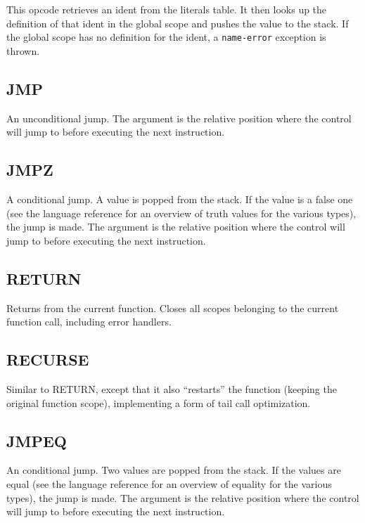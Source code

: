This opcode retrieves an ident from the literals table. It then looks up
the definition of that ident in the global scope and pushes the value to
the stack. If the global scope has no definition for the ident, a
\verb!name-error! exception is thrown.

\subsection{JMP}
\label{sec:jmp}

An unconditional jump. The argument is the relative position where the
control will jump to before executing the next instruction.

\subsection{JMPZ}
\label{sec:jmpz}

A conditional jump. A value is popped from the stack. If the value is
a false one (see the language reference for an overview of truth values
for the various types), the jump is made. The argument is the relative
position where the control will jump to before executing the next
instruction.

\subsection{RETURN}
\label{sec:return}

Returns from the current function. Closes all scopes belonging to the
current function call, including error handlers.

\subsection{RECURSE}
\label{sec:recurse}

Similar to RETURN, except that it also ``restarts'' the function
(keeping the original function scope), implementing a form of tail call
optimization.

\subsection{JMPEQ}
\label{sec:jmpeq}

An conditional jump. Two values are popped from the stack. If the values
are equal (see the language reference for an overview of equality for
the various types), the jump is made. The argument is the relative
position where the control will jump to before executing the next
instruction.

